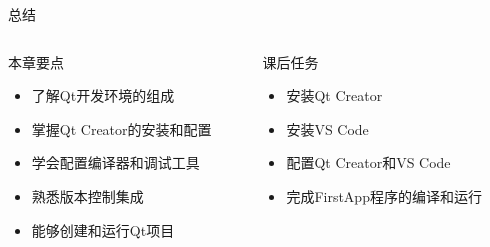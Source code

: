 \documentclass[UTF8,aspectratio=169]{beamer}
\begin{document}
\begin{frame}{总结}
    \begin{columns}
        \begin{column}{0.48\textwidth}
            \begin{ytublock}{本章要点}
                \begin{itemize}
                    \item 了解Qt开发环境的组成
                    \item 掌握Qt Creator的安装和配置
                    \item 学会配置编译器和调试工具
                    \item 熟悉版本控制集成
                    \item 能够创建和运行Qt项目
                \end{itemize}
            \end{ytublock}
        \end{column}
        \hspace{0.02\textwidth}
        \begin{column}{0.48\textwidth}
            \begin{ytublock}{课后任务}
                \begin{itemize}
                    \item 安装Qt Creator
                    \item 安装VS Code
                    \item 配置Qt Creator和VS Code
                    \item 完成FirstApp程序的编译和运行
                \end{itemize}
            \end{ytublock}
        \end{column}
    \end{columns}
\end{frame}
\end{document}

